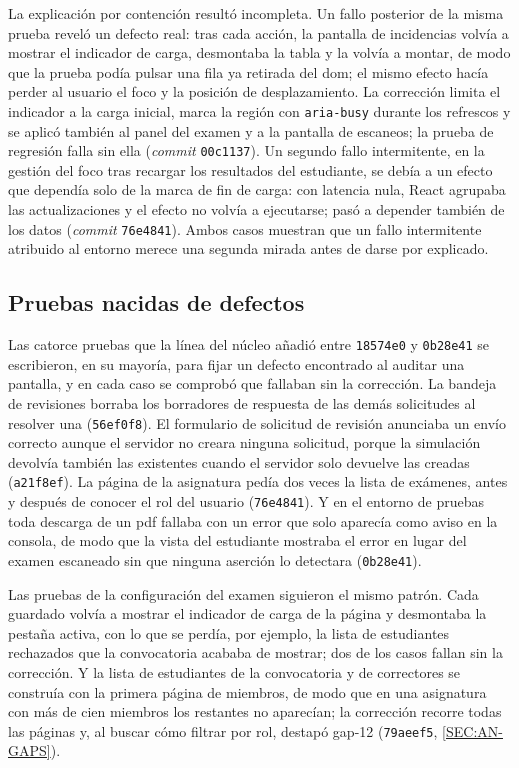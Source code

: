 La explicación por contención resultó incompleta. Un fallo posterior de la misma prueba
reveló un defecto real: tras cada acción, la pantalla de incidencias volvía a mostrar el
indicador de carga, desmontaba la tabla y la volvía a montar, de modo que la prueba podía
pulsar una fila ya retirada del \acs{dom}; el mismo efecto hacía perder al usuario el foco
y la posición de desplazamiento. La corrección limita el indicador a la carga inicial,
marca la región con \texttt{aria-busy} durante los refrescos y se aplicó también al panel
del examen y a la pantalla de escaneos; la prueba de regresión falla sin ella
(\textit{commit} \texttt{00c1137}). Un segundo fallo intermitente, en la gestión del foco
tras recargar los resultados del estudiante, se debía a un efecto que dependía solo de la
marca de fin de carga: con latencia nula, React agrupaba las actualizaciones y el efecto no
volvía a ejecutarse; pasó a depender también de los datos (\textit{commit}
\texttt{76e4841}). Ambos casos muestran que un fallo intermitente atribuido al entorno
merece una segunda mirada antes de darse por explicado.

\subsection{Pruebas nacidas de defectos}

Las catorce pruebas que la línea del núcleo añadió entre \texttt{18574e0} y
\texttt{0b28e41} se escribieron, en su mayoría, para fijar un defecto encontrado al auditar
una pantalla, y en cada caso se comprobó que fallaban sin la corrección. La bandeja de
revisiones borraba los borradores de respuesta de las demás solicitudes al resolver una
(\texttt{56ef0f8}). El formulario de solicitud de revisión anunciaba un envío correcto
aunque el servidor no creara ninguna solicitud, porque la simulación devolvía también las
existentes cuando el servidor solo devuelve las creadas (\texttt{a21f8ef}). La página de la
asignatura pedía dos veces la lista de exámenes, antes y después de conocer el rol del
usuario (\texttt{76e4841}). Y en el entorno de pruebas toda descarga de un \acs{pdf}
fallaba con un error que solo aparecía como aviso en la consola, de modo que la vista del
estudiante mostraba el error en lugar del examen escaneado sin que ninguna aserción lo
detectara (\texttt{0b28e41}).

Las pruebas de la configuración del examen siguieron el mismo
patrón. Cada guardado volvía a mostrar el indicador de carga de la página y desmontaba la
pestaña activa, con lo que se perdía, por ejemplo, la lista de estudiantes rechazados que
la convocatoria acababa de mostrar; dos de los casos fallan sin la corrección. Y la lista de estudiantes de la
convocatoria y de correctores se construía con la primera página de miembros, de modo que
en una asignatura con más de cien miembros los restantes no aparecían; la corrección
recorre todas las páginas y, al buscar cómo filtrar por rol, destapó gap-12
(\texttt{79aeef5}, \cref{SEC:AN-GAPS}).

